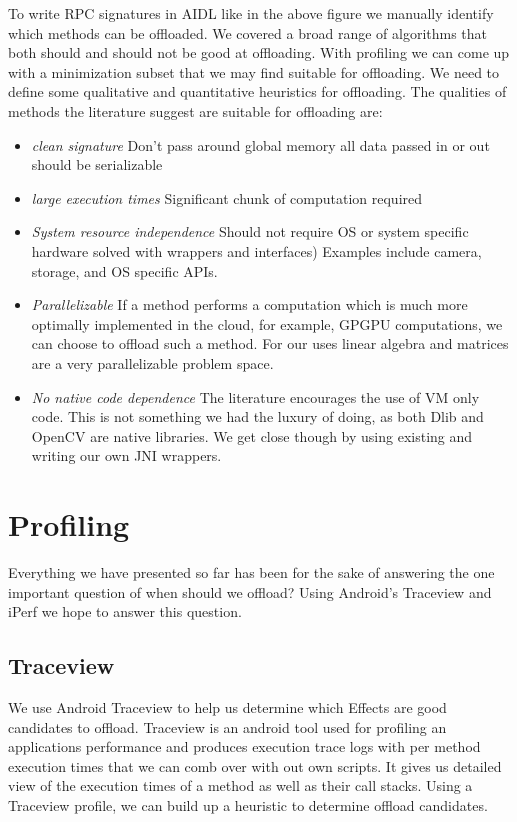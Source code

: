 \documentclass{sig-alternate}
\begin{document}
To write RPC signatures in AIDL like in the above figure we manually identify which methods can be offloaded. We covered a broad range of algorithms that both should and should not be good at offloading. With profiling we can come up with a minimization subset that we may find suitable for offloading. We need to define some qualitative and quantitative heuristics for offloading. The qualities of methods the literature  suggest are suitable for offloading are:
\begin{itemize}
\item \textit{clean signature} Don't pass around global memory all data passed in or out should be serializable
\item \textit{large execution times} Significant chunk of computation required
\item \textit{System resource independence} Should not require OS or system specific hardware solved with wrappers and interfaces) Examples include camera, storage, and OS specific APIs.
\item \textit{Parallelizable} If a method performs a computation which is much more optimally implemented in the cloud, for example, GPGPU computations, we can choose to offload such a method. For our uses linear algebra and matrices are a very parallelizable problem space.
\item \textit{No native code dependence} The literature encourages the use of  VM only code. This is not something we had the luxury of doing, as both Dlib and OpenCV are native libraries. We get close though by using existing and writing our own JNI wrappers.
\end{itemize}

\section{Profiling}
Everything we have presented so far has been for the sake of answering the one important question of when should we offload? Using Android's Traceview and iPerf we hope to answer this question.

\subsection{Traceview}
We use Android Traceview to help us determine which Effects are good candidates to offload. Traceview is an android tool used for profiling an applications performance and produces execution trace logs with per method execution times that we can comb over with out own scripts. It gives us detailed view of the execution times of a method as well as their call stacks. Using a Traceview profile, we  can build up a heuristic to determine offload candidates.
\end{document}
